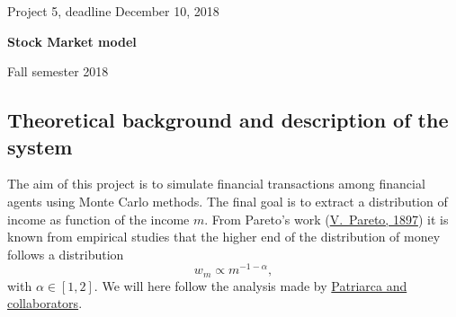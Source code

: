 \documentclass[%
oneside,                 %
final,                   %
10pt]{article}
\begin{document}

\newcommand{\exercisesection}[1]{\subsection*{#1}}






\thispagestyle{empty}

\begin{center}
{\LARGE\bf
\begin{spacing}{1.25}
Project 5, deadline  December 10, 2018
\end{spacing}
}
\end{center}


\begin{center}
{\bf Stock Market model${}^{}$} \\ [0mm]
\end{center}

\begin{center}
\end{center}
    

\begin{center}
Fall semester 2018
\end{center}

\vspace{1cm}


\subsection{Theoretical background and description of the system}

The aim of this project is to simulate financial transactions among financial agents
using Monte Carlo methods. The final goal is to extract a distribution of income  as function
of the income $m$.   From Pareto's work (\href{{http://www.institutcoppet.org/2012/05/08/cours-deconomie-politique-1896-de-vilfredo-pareto}}{V.~Pareto, 1897}) it is known from empirical studies
that the higher end of the distribution of money follows a distribution 
\[
w_m\propto m^{-1-\alpha},
\]
with $\alpha\in [1,2]$. We will here follow the analysis made by \href{{http://www.sciencedirect.com/science/article/pii/S0378437104004327}}{Patriarca and collaborators}. 
\end{document}
